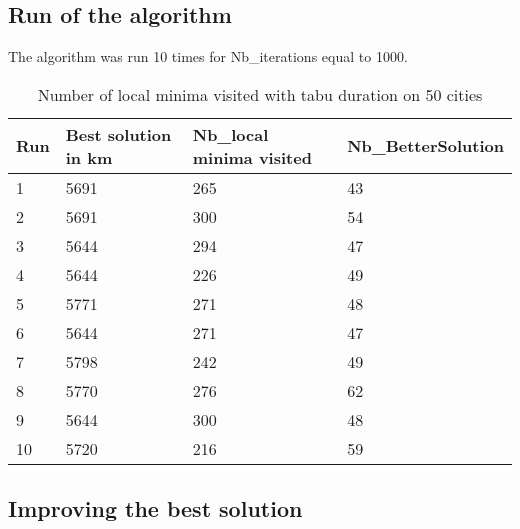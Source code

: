 \documentclass[12pt,oneside,a4paper]{article}
\begin{document}
\subsection{Run of the algorithm}
The algorithm was run 10 times for Nb\_iterations equal to 1000.
\begin{table}[h]
    \centering
    \small
    \begin{tabular}{llll}
      \hline
      \multicolumn{1}{|l|}{\textbf{Run}}& \multicolumn{1}{l|}{\textbf{Best solution in km}}& \multicolumn{1}{l|}{\textbf{Nb\_local minima visited}}& \multicolumn{1}{l|}{\textbf{Nb\_BetterSolution}}\\ \hline
      \multicolumn{1}{|l|}{1} & \multicolumn{1}{l|}{5691}  & \multicolumn{1}{l|}{265} & \multicolumn{1}{l|}{43}  \\ \hline
      \multicolumn{1}{|l|}{2} & \multicolumn{1}{l|}{5691}  & \multicolumn{1}{l|}{300} & \multicolumn{1}{l|}{54}  \\ \hline         
      \multicolumn{1}{|l|}{3} & \multicolumn{1}{l|}{5644}  & \multicolumn{1}{l|}{294}  & \multicolumn{1}{l|}{47}  \\ \hline
      \multicolumn{1}{|l|}{4} & \multicolumn{1}{l|}{5644}  & \multicolumn{1}{l|}{226}  & \multicolumn{1}{l|}{49}  \\ \hline
      \multicolumn{1}{|l|}{5} & \multicolumn{1}{l|}{5771}  & \multicolumn{1}{l|}{271}  & \multicolumn{1}{l|}{48}  \\ \hline
      \multicolumn{1}{|l|}{6} & \multicolumn{1}{l|}{5644}  & \multicolumn{1}{l|}{271}  & \multicolumn{1}{l|}{47}  \\ \hline
      \multicolumn{1}{|l|}{7} & \multicolumn{1}{l|}{5798}  & \multicolumn{1}{l|}{242}  & \multicolumn{1}{l|}{49}  \\ \hline
      \multicolumn{1}{|l|}{8} & \multicolumn{1}{l|}{5770}  & \multicolumn{1}{l|}{276} & \multicolumn{1}{l|}{62}  \\ \hline
      \multicolumn{1}{|l|}{9} & \multicolumn{1}{l|}{5644}  & \multicolumn{1}{l|}{300} & \multicolumn{1}{l|}{48}  \\ \hline
      \multicolumn{1}{|l|}{10} & \multicolumn{1}{l|}{5720}  & \multicolumn{1}{l|}{216} & \multicolumn{1}{l|}{59}  \\ \hline
    \end{tabular}
    \caption{Number of local minima visited with tabu duration on 50 cities}
  \end{table}

\subsection{Improving the best solution}
\end{document}
